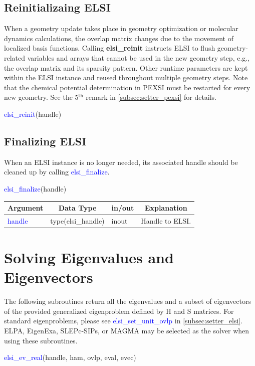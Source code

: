 \documentclass{report}
\begin{document}
\subsection{Reinitializaing ELSI}
\label{subsec:setup_reinit}
When a geometry update takes place in geometry optimization or molecular dynamics calculations, the overlap matrix changes due to the movement of localized basis functions. Calling \textbf{elsi\_reinit} instructs ELSI to flush geometry-related variables and arrays that cannot be used in the new geometry step, e.g., the overlap matrix and its sparsity pattern. Other runtime parameters are kept within the ELSI instance and reused throughout multiple geometry steps. Note that the chemical potential determination in PEXSI must be restarted for every new geometry. See the 5$^\text{th}$ remark in \ref{subsec:setter_pexsi} for details.
\begin{labeling}{\hspace{6cm}}
\item [\hspace{0.3cm} \textcolor{blue}{elsi\_reinit}(handle)]
\end{labeling}

\subsection{Finalizing ELSI}
\label{subsec:setup_final}
When an ELSI instance is no longer needed, its associated handle should be cleaned up by calling \textcolor{blue}{elsi\_finalize}.
\begin{labeling}{\hspace{6cm}}
\item [\hspace{0.3cm} \textcolor{blue}{elsi\_finalize}(handle)]
\end{labeling}

\begin{tabular}[]{|p{30mm}|p{30mm}|p{15mm}|p{90mm}|}
\hline
\multicolumn{1}{|c|}{\textbf{Argument}} & \multicolumn{1}{c|}{\textbf{Data Type}} & \multicolumn{1}{c|}{\textbf{in/out}} & \multicolumn{1}{c|}{\textbf{Explanation}}\\
\hline
\textcolor{blue}{handle} & type(elsi\_handle) & inout & Handle to ELSI.\\
\hline
\end{tabular}

\section{Solving Eigenvalues and Eigenvectors}
\label{sec:ev}
The following subroutines return all the eigenvalues and a subset of eigenvectors of the provided generalized eigenproblem defined by H and S matrices. For standard eigenproblems, please see \textcolor{blue}{elsi\_set\_unit\_ovlp} in \ref{subsec:setter_elsi}. ELPA, EigenExa, SLEPc-SIPs, or MAGMA may be selected as the solver when using these subroutines.
\begin{labeling}{\hspace{6cm}}
\item [\hspace{0.3cm} \textcolor{blue}{elsi\_ev\_real}(handle, ham, ovlp, eval, evec)]
\end{labeling}
\end{document}

